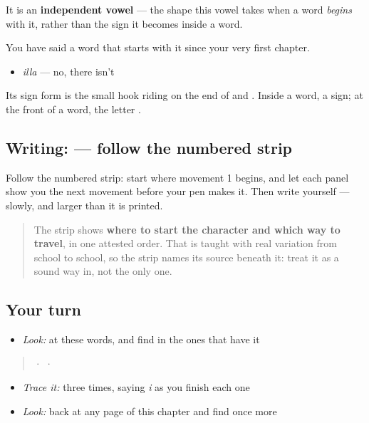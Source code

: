 It is an \textbf{independent vowel} — the shape this vowel takes when a word \emph{begins} with it, rather than the sign it becomes inside a word.

You have said a word that starts with it since your very first chapter.

\begin{itemize}
\raggedright
  \item \textbf{} \emph{illa} — no, there isn't
\end{itemize}

Its sign form is the small hook riding on the end of \textbf{} and \textbf{}. Inside a word, a sign; at the front of a word, the letter \textbf{}.

\subsection*{Writing:  — follow the numbered strip}

Follow the numbered strip: start where movement 1 begins, and let each panel show you the next movement before your pen makes it. Then write  yourself — slowly, and larger than it is printed.

\begin{quote}
The strip shows \textbf{where to start the character and which way to travel}, in one attested order. That is taught with real variation from school to school, so the strip names its source beneath it: treat it as a sound way in, not the only one.
\end{quote}

\subsection*{Your turn}
\begin{itemize}
\raggedright
  \item \emph{Look:} at these words, and find  in the ones that have it
\end{itemize}

\begin{quote}
  ·    ·  
\end{quote}

\begin{itemize}
\raggedright
  \item \emph{Trace it:}  three times, saying \emph{i} as you finish each one
  \item \emph{Look:} back at any page of this chapter and find  once more
\end{itemize}

